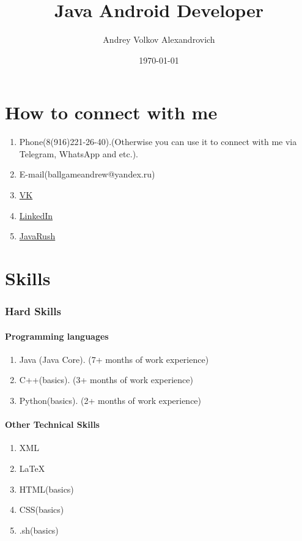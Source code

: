 \documentclass[a4paper, 12pt]{article}
\author{Andrey Volkov Alexandrovich}
\title{Java Android Developer}
\date{\today}
\begin{document}
	\rm
	\maketitle
	
	\part{How to connect with me}
	\bf
	\begin{enumerate}
		\item Phone(8(916)221-26-40).(Otherwise you can use it to connect with me via Telegram, WhatsApp and etc.).
		\item E-mail(ballgameandrew@yandex.ru)
		\item \href{https://vk.com/andrey_vlk}{VK}
		\item \href{https://www.linkedin.com/in/andre-volkov-v/}{LinkedIn}
		\item \href{https://javarush.ru/users/2482341}{JavaRush}
	\end{enumerate}
	\rm
	
	\part{Skills}
	\section*{Hard Skills}
	\subsection*{Programming languages}
	\begin{enumerate}
		\item Java (Java Core). (7+ months of work experience)
		\item C++(basics). (3+ months of work experience)
		\item Python(basics). (2+ months of work experience)
	\end{enumerate}
	\subsection*{Other Technical Skills}
	\begin{enumerate}
		\item XML
		\item \LaTeX
		\item HTML(basics)
		\item CSS(basics)
		\item .sh\cite{bashing}(basics)
	\end{enumerate}
\end{document}
